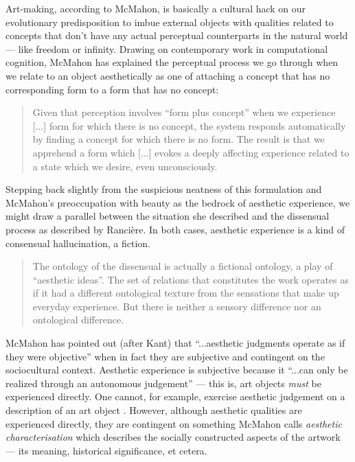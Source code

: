             Art-making, according to McMahon, is basically a cultural hack on our evolutionary predisposition to imbue external objects with qualities related to concepts that don't have any actual perceptual counterparts in the natural world — like freedom or infinity. Drawing on contemporary work in computational cognition, McMahon has explained the perceptual process we go through when we relate to an object aesthetically as one of attaching a concept that has no corresponding form to a form that has no concept:

            \begin{quotation}
                Given that perception involves “form plus concept” when we experience [...] form for which there is no concept, the system responds automatically by finding a concept for which there is no form. The result is that we apprehend a form which [...] evokes a deeply affecting experience related to a state which we desire, even unconsciously. \citep[p.14]{McMahonAsthtcsAndMtrlBty2007}
            \end{quotation}

            Stepping back slightly from the suspicious neatness of this formulation and McMahon's preoccupation with beauty as the bedrock of aesthetic experience, we might draw a parallel between the situation she described and the dissensual process as described by Rancière. In both cases, aesthetic experience is a kind of consensual hallucination, a fiction.

            \begin{quotation}
                The ontology of the dissensual is actually a fictional ontology, a play of “aesthetic ideas”. The set of relations that constitutes the work operates as if it had a different ontological texture from the sensations that make up everyday experience. But there is neither a sensory difference nor an ontological difference. \citep[p.55]{RancierThEmncptdSpcttr2009}
            \end{quotation}

            McMahon has pointed out (after Kant) that “...aesthetic judgments operate as if they were objective” \citep[p.51]{McMahonCrtclAsthtcRlsm2011} when in fact they are subjective and contingent on the sociocultural context. Aesthetic experience is subjective because it “...can only be realized through an autonomous judgement” \citep[p.59]{McMahonAsthtcsAndMtrlBty2007} — this is, art objects \emph{must} be experienced directly. One cannot, for example, exercise aesthetic judgement on a description of an art object \citep[p.59]{McMahonAsthtcsAndMtrlBty2007}. However, although aesthetic qualities are experienced directly, they are contingent on something McMahon calls \emph{aesthetic characterisation} \citep[pp.41-47]{McMahonAsthtcsAndMtrlBty2007} which describes the socially constructed aspects of the artwork — its meaning, historical significance, et cetera.

